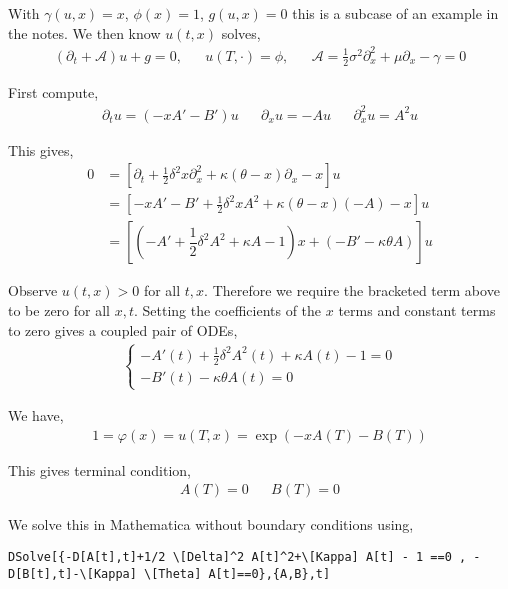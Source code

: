 \begin{solution}[Solution]
With \( \gamma(u,x) = x \), \( \phi(x) = 1 \), \( g(u,x) = 0 \) this is a subcase of an example in the notes. We then know \( u(t,x) \) solves,
\begin{align*}
    (\partial_t + \mathcal{A})u + g = 0, && u(T,\cdot) = \phi, && \mathcal{A} = \frac{1}{2} \sigma^2 \partial_x^2 + \mu \partial_x-\gamma = 0
\end{align*}

First compute,
\begin{align*}
    \partial_t u = (-xA'-B')u &&
    \partial_x u = -A u &&
    \partial_x^2 u = A^2 u
\end{align*}

This gives,
\begin{align*}
    0 &= \left[\partial_t + \frac{1}{2} \delta^2 x \partial_x^2 + \kappa(\theta-x) \partial_x - x \right] u  \\
    &= \left[ - xA'-B' + \frac{1}{2} \delta^2 x A^2 + \kappa(\theta-x) (-A) - x \right] u \\
    &=  \left[\left(-A'+\dfrac{1}{2}\delta^2A^2 + \kappa A - 1\right) x + \left( -B' - \kappa\theta A \right) \right] u
\end{align*}

Observe \( u(t,x) > 0 \) for all \( t,x \). Therefore we require the bracketed term above to be zero for all \( x, t \). Setting the coefficients of the \( x \) terms and constant terms to zero gives a coupled pair of ODEs,
\begin{align*}
    \begin{cases}
        -A'(t)+\frac{1}{2}\delta^2A^2(t) + \kappa A(t) - 1 = 0 \\
        -B'(t) - \kappa\theta A(t)  = 0
    \end{cases}
\end{align*}

We have,
\begin{align*}
    1 = \varphi(x) = u(T,x) = \exp \left( -xA(T) - B(T) \right)
\end{align*}

This gives terminal condition,
\begin{align*}
    A(T) = 0 &&  B(T) = 0
\end{align*}


We solve this in Mathematica without boundary conditions using,
\begin{lstlisting}
DSolve[{-D[A[t],t]+1/2 \[Delta]^2 A[t]^2+\[Kappa] A[t] - 1 ==0 , -D[B[t],t]-\[Kappa] \[Theta] A[t]==0},{A,B},t]
\end{lstlisting}


\end{solution}
